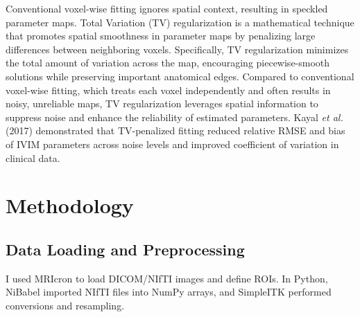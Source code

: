 \documentclass[a4paper,12pt]{article}
\begin{document}
Conventional voxel-wise fitting ignores spatial context, resulting in speckled parameter maps. Total Variation (TV) regularization is a mathematical technique that promotes spatial smoothness in parameter maps by penalizing large differences between neighboring voxels. Specifically, TV regularization minimizes the total amount of variation across the map, encouraging piecewise-smooth solutions while preserving important anatomical edges. Compared to conventional voxel-wise fitting, which treats each voxel independently and often results in noisy, unreliable maps, TV regularization leverages spatial information to suppress noise and enhance the reliability of estimated parameters. Kayal \textit{et al.} (2017) demonstrated that TV-penalized fitting reduced relative RMSE and bias of IVIM parameters across noise levels and improved coefficient of variation in clinical data.
\section{Methodology}
\subsection{Data Loading and Preprocessing}
I used MRIcron to load DICOM/NIfTI images and define ROIs. In Python, NiBabel imported NIfTI files into NumPy arrays, and SimpleITK performed conversions and resampling.
\end{document}
